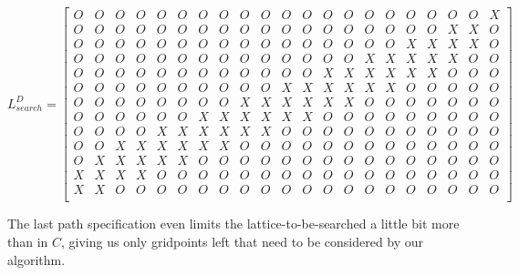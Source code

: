 \[ L_{search}^D = 
\left[
\begin{array}{cccccccccccccccccccccc}
 O & O & O & O & O & O & O & O & O & O & O & O & O & O & O & O & O & O & O & O & X \\
 O & O & O & O & O & O & O & O & O & O & O & O & O & O & O & O & O & O & X & X & O \\
 O & O & O & O & O & O & O & O & O & O & O & O & O & O & O & O & X & X & X & X & O \\
 O & O & O & O & O & O & O & O & O & O & O & O & O & O & X & X & X & X & X & O & O \\
 O & O & O & O & O & O & O & O & O & O & O & O & X & X & X & X & X & X & O & O & O \\
 O & O & O & O & O & O & O & O & O & O & X & X & X & X & X & X & O & O & O & O & O \\
 O & O & O & O & O & O & O & O & X & X & X & X & X & X & O & O & O & O & O & O & O \\
 O & O & O & O & O & O & X & X & X & X & X & X & O & O & O & O & O & O & O & O & O \\
 O & O & O & O & X & X & X & X & X & X & O & O & O & O & O & O & O & O & O & O & O \\
 O & O & X & X & X & X & X & X & O & O & O & O & O & O & O & O & O & O & O & O & O \\
 O & X & X & X & X & X & O & O & O & O & O & O & O & O & O & O & O & O & O & O & O \\
 X & X & X & X & O & O & O & O & O & O & O & O & O & O & O & O & O & O & O & O & O \\
 X & X & O & O & O & O & O & O & O & O & O & O & O & O & O & O & O & O & O & O & O \\
\end{array}
\right]
\]

The last path specification even limits the lattice-to-be-searched a little bit more than in $C$, 
giving us only  gridpoints left that need to be considered by our algorithm.




